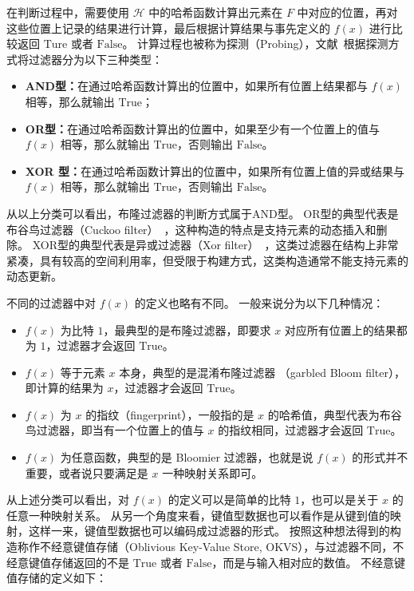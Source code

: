 在判断过程中，需要使用 $\mathcal{H}$ 中的哈希函数计算出元素在 $F$ 中对应的位置，再对这些位置上记录的结果进行计算，最后根据计算结果与事先定义的 $f(x)$ 进行比较返回 $\mbox{Ture}$ 或者 $\mbox{False}$。
计算过程也被称为探测（Probing），文献~\cite{dillinger2021ribbon}根据探测方式将过滤器分为以下三种类型：
\begin{itemize}
    \item \textbf{AND型：}在通过哈希函数计算出的位置中，如果所有位置上结果都与 $f(x)$ 相等，那么就输出 $\mbox{True}$；
    \item \textbf{OR型：}在通过哈希函数计算出的位置中，如果至少有一个位置上的值与 $f(x)$ 相等，那么就输出 $\mbox{True}$，否则输出 $\mbox{False}$。
    \item \textbf{XOR 型：}在通过哈希函数计算出的位置中，如果所有位置上值的异或结果与 $f(x)$ 相等，那么就输出 $\mbox{True}$，否则输出 $\mbox{False}$。
\end{itemize}
从以上分类可以看出，布隆过滤器的判断方式属于AND型。
OR型的典型代表是布谷鸟过滤器（Cuckoo filter）~\cite{fan2014cuckoo}，这种构造的特点是支持元素的动态插入和删除。
XOR型的典型代表是异或过滤器（Xor filter）~\cite{fan2014cuckoo}，这类过滤器在结构上非常紧凑，具有较高的空间利用率，但受限于构建方式，这类构造通常不能支持元素的动态更新。

不同的过滤器中对 $f(x)$ 的定义也略有不同。
一般来说分为以下几种情况：
\begin{itemize}
    \item $f(x)$ 为比特 $1$，最典型的是布隆过滤器，即要求 $x$ 对应所有位置上的结果都为 $1$，过滤器才会返回 $\mbox{True}$。
    \item $f(x)$ 等于元素 $x$ 本身，典型的是混淆布隆过滤器 （garbled Bloom filter），即计算的结果为 $x$，过滤器才会返回 $\mbox{True}$。
    \item $f(x)$ 为 $x$ 的指纹（fingerprint），一般指的是 $x$ 的哈希值，典型代表为布谷鸟过滤器，即当有一个位置上的值与 $x$ 的指纹相同，过滤器才会返回 $\mbox{True}$。
    \item $f(x)$ 为任意函数，典型的是 Bloomier 过滤器，也就是说 $f(x)$ 的形式并不重要，或者说只要满足是 $x$ 一种映射关系即可。
\end{itemize}

从上述分类可以看出，对 $f(x)$ 的定义可以是简单的比特 $1$，也可以是关于 $x$ 的任意一种映射关系。
从另一个角度来看，键值型数据也可以看作是从键到值的映射，这样一来，键值型数据也可以编码成过滤器的形式。
按照这种想法得到的构造称作不经意键值存储（Oblivious Key-Value Store, OKVS），与过滤器不同，不经意键值存储返回的不是 $\mbox{True}$ 或者 $\mbox{False}$，而是与输入相对应的数值。
不经意键值存储的定义如下：

